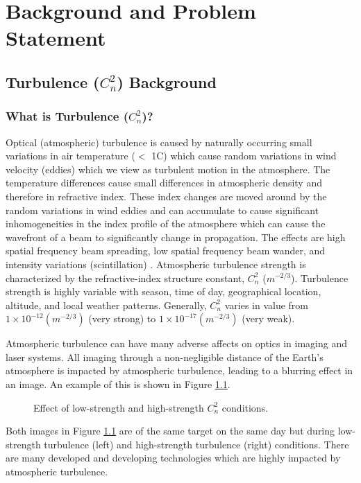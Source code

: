 \chapter{Background and Problem Statement}
\label{ch1}

\section{Turbulence ($C_{n}^{2}$) Background}
\subsection{What is Turbulence ($C_{n}^{2}$)?}
Optical (atmospheric) turbulence is caused by naturally occurring small variations in air temperature ($<$ 1\textdegree C) which cause random variations in wind velocity (eddies) which we view as turbulent motion in the atmosphere. The temperature differences cause small differences in atmospheric density and therefore in refractive index. These index changes are moved around by the random variations in wind eddies and can accumulate to cause significant inhomogeneities in the index profile of the atmosphere which can cause the wavefront of a beam to significantly change in propagation. The effects are high spatial frequency beam spreading, low spatial frequency beam wander, and intensity variations (scintillation) \cite{tyson2011principles}. Atmospheric turbulence strength is characterized by the refractive-index structure constant, $C_{n}^{2}$ ($m^{-2/3}$). Turbulence strength is highly variable with season, time of day, geographical location, altitude, and local weather patterns. Generally, $C_{n}^{2}$ varies in value from $1 \times 10^{-12} (m^{-2/3})$ (very strong) to $1 \times 10^{-17} (m^{-2/3})$ (very weak).

Atmospheric turbulence can have many adverse affects on optics in imaging and laser systems. All imaging through a non-negligible distance of the Earth's atmosphere is impacted by atmospheric turbulence, leading to a blurring effect in an image. An example of this is shown in Figure \ref{fig:first_frames}.
\begin{figure}[h!]
	\centering
	\hfill
	\caption{Effect of low-strength and high-strength $C_{n}^{2}$ conditions.}
	\label{fig:first_frames}
\end{figure}
Both images in Figure \ref{fig:first_frames} are of the same target on the same day but during low-strength turbulence (left) and high-strength turbulence (right) conditions. There are many developed and developing technologies which are highly impacted by atmospheric turbulence.

